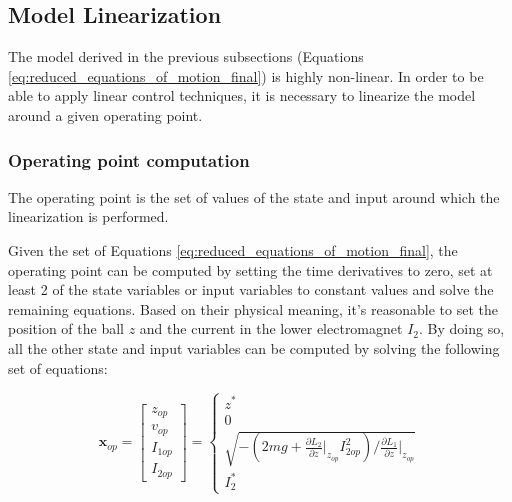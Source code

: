 \subsection{Model Linearization}
\label{subsec:model_linearization}

The model derived in the previous subsections (Equations \ref{eq:reduced_equations_of_motion_final}) is highly non-linear.
In order to be able to apply linear control techniques, it is necessary to linearize the model around a given operating point.



\subsubsection{Operating point computation}
\label{subsubsec:operating_point_computation}

The operating point is the set of values of the state and input around which the linearization is performed.

Given the set of Equations \ref{eq:reduced_equations_of_motion_final}, the operating point can be computed by setting the time derivatives to zero, set at least 2 of the state variables or input variables to constant values and solve the remaining equations.
Based on their physical meaning, it's reasonable to set the position of the ball $z$ and the current in the lower electromagnet $I_2$.
By doing so, all the other state and input variables can be computed by solving the following set of equations:

\begin{equation}
    \mathbf{x}_{op} =
    \begin{bmatrix}
        z_{op}  \\
        v_{op}  \\
        I_{1op} \\
        I_{2op}
    \end{bmatrix}
    =
    \begin{cases}
        z^*                                                                                                                          \\
        0                                                                                                                            \\
        \sqrt{ -(2m g + \frac{\partial L_2}{\partial z} \big|_{z_{op}} I_{2op}^2) / \frac{\partial L_1}{\partial z} \big|_{z_{op}} } \\
        I_{2}^*
    \end{cases}
    \label{eq:operating_point_states}
\end{equation}

